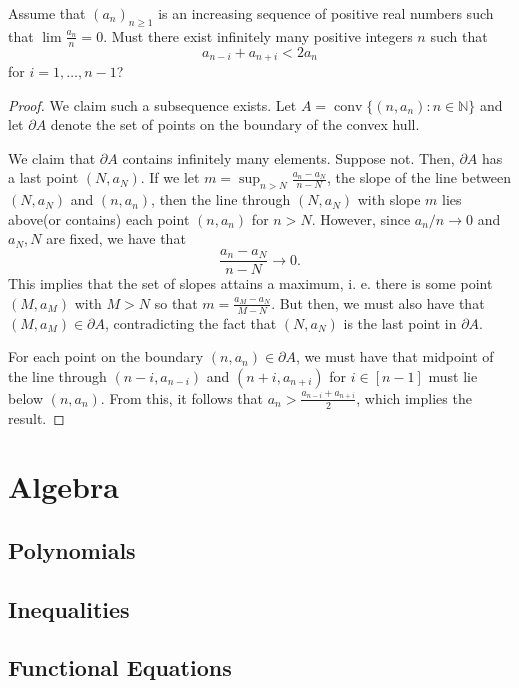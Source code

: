 \documentclass[11pt]{article}
\newcommand{\N}{\mathbb{N}}
\renewcommand{\>}{\rangle}
\newcommand{\<}{\langle}
\begin{document}
\begin{problem}[Putnam 2001 B6] Assume that $(a_n)_{n \ge 1}$ is an increasing sequence of positive real numbers such that $\lim \frac{a_n}{n} = 0$.  Must there exist infinitely many positive integers $n$ such that 
$$a_{n-i} + a_{n+i} < 2a_n$$
for $i = 1, \dots, n-1$?
\end{problem}
\begin{proof}
We claim such a subsequence exists.   Let $A = \operatorname{conv}\{(n, a_n) : n \in \N\}$ and let $\partial A$ denote the set of points on the boundary of the convex hull.  

We claim that $\partial A$ contains infinitely many elements.  Suppose not.  Then, $\partial A$ has a last point $(N, a_N)$.  If we let $m = \sup_{n > N} \frac{a_n - a_N}{n - N}$, the slope of the line between $(N, a_N)$ and $(n, a_n)$, then the line through $(N, a_N)$ with slope $m$ lies above(or contains) each point $(n, a_n)$ for $n > N$.  However, since $a_n/n \to 0$ and $a_N, N$ are fixed, we have that $$\frac{a_n - a_N}{n - N} \to 0.$$
This implies that the set of slopes attains a maximum, i. e. there is some point $(M, a_M)$ with $M > N$ so that $m = \frac{a_M - a_N}{M - N}$.  But then, we must also have that $(M, a_M) \in \partial A$, contradicting the fact that $(N, a_N)$ is the last point in $\partial A$.

For each point on the boundary $(n, a_n) \in \partial A$, we must have that midpoint of the line through $(n-i, a_{n-i})$ and $(n+i, a_{n+i})$ for $i \in [n-1]$ must lie below $(n, a_n)$.  From this, it follows that $a_n > \frac{a_{n-i} + a_{n+i}}{2}$, which implies the result.  
\end{proof}

\pagebreak
\section{Algebra}
\subsection{Polynomials}
\subsection{Inequalities}
\subsection{Functional Equations}
\end{document}
